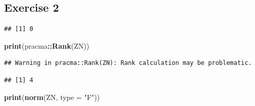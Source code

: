 \documentclass[
]{book}
\newenvironment{Shaded}{\begin{snugshade}}{\end{snugshade}}
\newcommand{\DataTypeTok}[1]{\textcolor[rgb]{0.13,0.29,0.53}{#1}}
\newcommand{\DecValTok}[1]{\textcolor[rgb]{0.00,0.00,0.81}{#1}}
\newcommand{\FloatTok}[1]{\textcolor[rgb]{0.00,0.00,0.81}{#1}}
\newcommand{\KeywordTok}[1]{\textcolor[rgb]{0.13,0.29,0.53}{\textbf{#1}}}
\newcommand{\NormalTok}[1]{#1}
\newcommand{\OperatorTok}[1]{\textcolor[rgb]{0.81,0.36,0.00}{\textbf{#1}}}
\newcommand{\StringTok}[1]{\textcolor[rgb]{0.31,0.60,0.02}{#1}}
\begin{document}
\hypertarget{exercise-2-3}{%
\subsection*{Exercise 2}\label{exercise-2-3}}

\begin{Shaded}
\end{Shaded}

\begin{verbatim}
## [1] 0
\end{verbatim}

\begin{Shaded}
\begin{Highlighting}[]
\KeywordTok{print}\NormalTok{(pracma}\OperatorTok{::}\KeywordTok{Rank}\NormalTok{(ZN))}
\end{Highlighting}
\end{Shaded}

\begin{verbatim}
## Warning in pracma::Rank(ZN): Rank calculation may be problematic.
\end{verbatim}

\begin{verbatim}
## [1] 4
\end{verbatim}

\begin{Shaded}
\begin{Highlighting}[]
\KeywordTok{print}\NormalTok{(}\KeywordTok{norm}\NormalTok{(ZN, }\DataTypeTok{type =} \StringTok{"F"}\NormalTok{))}
\end{Highlighting}
\end{Shaded}
\end{document}
